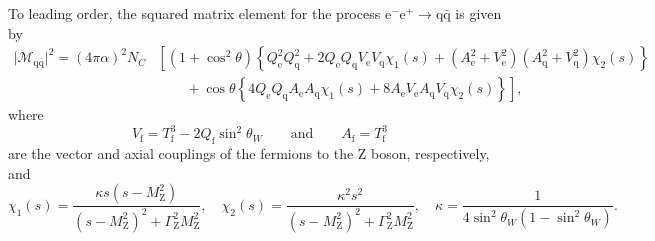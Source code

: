 To leading order, the squared matrix element for the process $\mathrm{e}^{-} \mathrm{e}^{+} \to \mathrm{q} \bar{\mathrm{q}}$ is given by
\begin{equation}
    \begin{aligned}
    \lvert \mathcal{M}_{\mathrm{q} \bar{\mathrm{q}}} \rvert^{2} = (4 \pi \alpha)^{2} N_{C} & \left[
    \left( 1 + \cos^{2}{\theta} \right) \left\{ Q_{\mathrm{e}}^{2} Q_{\mathrm{q}}^{2} + 2 Q_{\mathrm{e}} Q_{\mathrm{q}} V_{\mathrm{e}} V_{\mathrm{q}} \chi_{1}(s) + \left( A_{\mathrm{e}}^{2} + V_{\mathrm{e}}^{2} \right) \left( A_{\mathrm{q}}^{2} + V_{\mathrm{q}}^{2} \right) \chi_{2}(s) \right\}
    \right. \\
    & \left. \qquad + \cos{\theta} \left\{ 4 Q_{\mathrm{e}} Q_{\mathrm{q}} A_{\mathrm{e}} A_{\mathrm{q}} \chi_{1}(s) + 8 A_{\mathrm{e}} V_{\mathrm{e}} A_{\mathrm{q}} V_{\mathrm{q}} \chi_{2}(s) \right\} \right],
    \end{aligned}
\end{equation}
where
\begin{equation}
    V_{\mathrm{f}} = T_{\mathrm{f}}^{3} - 2 Q_{\mathrm{f}} \sin^{2}{\theta_{W}} \qquad \text{and} \qquad A_{\mathrm{f}} = T_{\mathrm{f}}^{3}
\end{equation}
are the vector and axial couplings of the fermions to the Z boson, respectively, and 
\begin{equation}
    \chi_{1}(s) = \frac{ \kappa s (s - M_{\text{Z}}^{2})}{(s - M_{\text{Z}}^{2})^{2} + \Gamma_{\text{Z}}^{2} M_{\text{Z}}^{2}}, \quad \chi_{2}(s) = \frac{\kappa^{2} s^{2}}{(s - M_{\text{Z}}^{2})^{2} + \Gamma_{\text{Z}}^{2} M_{\text{Z}}^{2}}, \quad \kappa = \frac{1}{4 \sin^{2}{\theta_{W}}(1 - \sin^{2}{\theta_{W}})}.
\end{equation}
